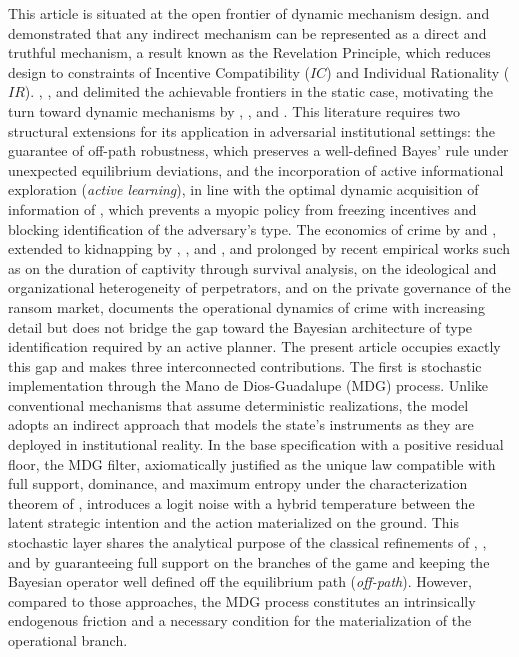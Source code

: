 \documentclass[ecta,nameyear,draft]{econsocart}
\theoremstyle{plain}
\theoremstyle{definition}
\newcommand{\1}{\mathbf{1}}
\begin{document}
This article is situated at the open frontier of dynamic mechanism design. \citet{Gibbard1973} and \citet{Myerson1979IC,Myerson1981} demonstrated that any indirect mechanism can be represented as a direct and truthful mechanism, a result known as the Revelation Principle, which reduces design to constraints of Incentive Compatibility ($IC$) and Individual Rationality ($IR$). \citet{MyersonSatterthwaite1983}, \citet{Rochet1987}, and \citet{RochetChone1998} delimited the achievable frontiers in the static case, motivating the turn toward dynamic mechanisms by \citet{CourtyLi2000}, \citet{EsoSzentes2007}, and \citet{PavanSegalToikka2014}. This literature requires two structural extensions for its application in adversarial institutional settings: the guarantee of off-path robustness, which preserves a well-defined Bayes' rule under unexpected equilibrium deviations, and the incorporation of active informational exploration (\textit{active learning}), in line with the optimal dynamic acquisition of information of \citet{Zhong2022}, which prevents a myopic policy from freezing incentives and blocking identification of the adversary's type. The economics of crime by \citet{Becker1968} and \citet{Ehrlich1973}, extended to kidnapping by \citet{Selten1977Kidnapping}, \citet{Iqbal2017Kidnapping}, and \citet{Mejia2000Secuestro}, and prolonged by recent empirical works such as \citet{Detotto2014Ransom} on the duration of captivity through survival analysis, \citet{Forest2012Kidnapping} on the ideological and organizational heterogeneity of perpetrators, and \citet{Shortland2019Kidnap} on the private governance of the ransom market, documents the operational dynamics of crime with increasing detail but does not bridge the gap toward the Bayesian architecture of type identification required by an active planner. The present article occupies exactly this gap and makes three interconnected contributions. The first is stochastic implementation through the Mano de Dios-Guadalupe (MDG) process. Unlike conventional mechanisms that assume deterministic realizations, the model adopts an indirect approach that models the state's instruments as they are deployed in institutional reality. In the base specification with a positive residual floor, the MDG filter, axiomatically justified as the unique law compatible with full support, dominance, and maximum entropy under the characterization theorem of \citet{Jaynes1957Information}, introduces a logit noise with a hybrid temperature between the latent strategic intention and the action materialized on the ground. This stochastic layer shares the analytical purpose of the classical refinements of \citet{Selten1975Perfectness}, \citet{KrepsWilson1982}, and \citet{FudenbergTirole1991} by guaranteeing full support on the branches of the game and keeping the Bayesian operator well defined off the equilibrium path (\textit{off-path}). However, compared to those approaches, the MDG process constitutes an intrinsically endogenous friction and a necessary condition for the materialization of the operational branch.
\end{document}
